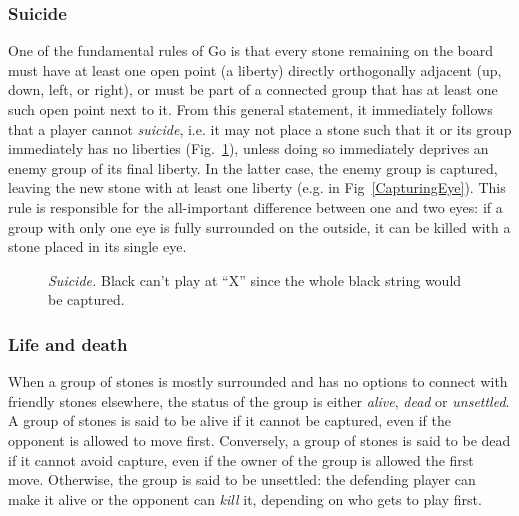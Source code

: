 \subsubsection{Suicide}
One of the fundamental rules of Go is that every stone remaining on the board must have at least one open point (a liberty) directly orthogonally adjacent (up, down, left, or right), or must be part of a connected group that has at least one such open point next to it. From this general statement, it immediately follows that a player cannot \emph{suicide}, i.e. it may not place a stone such that it or its group immediately has no liberties (Fig.~\ref{Suicide}), unless doing so immediately deprives an enemy group of its final liberty. In the latter case, the enemy group is captured, leaving the new stone with at least one liberty (e.g. in Fig~\ref{CapturingEye}). This rule is responsible for the all-important difference between one and two eyes: if a group with only one eye is fully surrounded on the outside, it can be killed with a stone placed in its single eye.
\begin{figure}[h!t]
\centering
{}
\caption{\emph{Suicide.} Black can't play at ``X'' since the whole black string would be captured.}\label{Suicide}
\end{figure}
\subsubsection{Life and death}
When a group of stones is mostly surrounded and has no options to connect with friendly stones elsewhere, the status of the group is either \emph{alive}, \emph{dead} or \emph{unsettled}. A group of stones is said to be alive if it cannot be captured, even if the opponent is allowed to move first. Conversely, a group of stones is said to be dead if it cannot avoid capture, even if the owner of the group is allowed the first move. Otherwise, the group is said to be unsettled: the defending player can make it alive or the opponent can \emph{kill} it, depending on who gets to play first.

